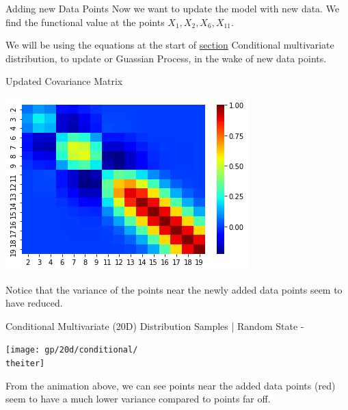 \documentclass{beamer}
\begin{document}
\begin{frame}{Adding new Data Points}
	Now we want to update the model with new data. We find the functional value at the points $X_1, X_2, X_6, X_11$.
	
	We will be using the equations at the start of \hyperref[sec:condMul]{section} Conditional multivariate distribution, to update or Guassian Process, in the wake of new data points.
\end{frame}

\begin{frame}{Updated Covariance Matrix}
	\begin{center}
		\includegraphics[width=\linewidth, height=\textheight -120pt ,keepaspectratio]{gp/post20d}
	\end{center}
	Notice that the variance of the points near the newly added data points seem to have reduced.
\end{frame}

%
{%
	\begin{frame}{Conditional Multivariate (20D) Distribution Samples | Random State - \theiter}
		\begin{center}
			\texttt{[image: gp/20d/conditional/\\theiter]}
		\end{center}
		From the animation above, we can see points near the added data points (red) seem to have a much lower variance compared to points far off.
	\end{frame}
}
\end{document}
